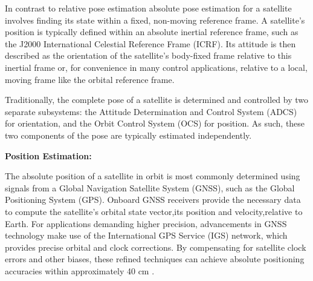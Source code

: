 
In contrast to relative pose estimation absolute pose estimation for a satellite involves finding its state within a fixed, non-moving reference frame. A satellite's position is typically defined within an absolute inertial reference frame, such as the J2000 International Celestial Reference Frame (ICRF). Its attitude is then described as the orientation of the satellite's body-fixed frame relative to this inertial frame or, for convenience in many control applications, relative to a local, moving frame like the orbital reference frame.


Traditionally, the complete pose of a satellite is determined and controlled by two separate subsystems: the Attitude Determination and Control System (ADCS) for orientation, and the Orbit Control System (OCS) for position. As such, these two components of the pose are typically estimated independently.
\vspace{0.5cm}

\noindent
\textbf{Position Estimation:}

\noindent
The absolute position of a satellite in orbit is most commonly determined using signals from a Global Navigation Satellite System (GNSS), such as the Global Positioning System (GPS). Onboard GNSS receivers provide the necessary data to compute the satellite's orbital state vector,its position and velocity,relative to Earth. For applications demanding higher precision, advancements in GNSS technology make use of the International GPS Service (IGS) network, which provides precise orbital and clock corrections. By compensating for satellite clock errors and other biases, these refined techniques can achieve absolute positioning accuracies within approximately 40 cm \cite{Han}.
\vspace{0.5cm}

